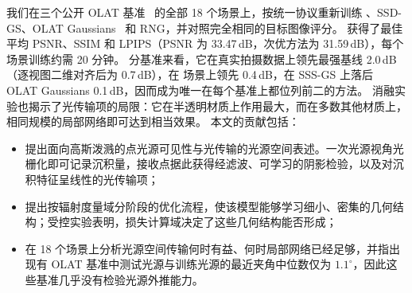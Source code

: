 我们在三个公开 OLAT 基准~\cite{zeng2023nrhints,bi2024gs3,dihlmann2024sss} 的全部 18 个场景上，按统一协议重新训练 \gsthree、SSD-GS、OLAT Gaussians~\cite{kuang2024olat} 和 RNG，并对照完全相同的目标图像评分。
\ours 获得了最佳平均 PSNR、SSIM 和 LPIPS（PSNR 为 33.47\,dB，次优方法为 31.59\,dB），每个场景训练约需 20 分钟。
分基准来看，它在真实拍摄数据上领先最强基线 2.0\,dB（逐视图二维对齐后为 0.7\,dB），在 \gsthree 场景上领先 0.4\,dB，在 SSS-GS 上落后 OLAT Gaussians 0.1\,dB，因而成为唯一在每个基准上都位列前二的方法。
消融实验也揭示了光传输项的局限：它在半透明材质上作用最大，而在多数其他材质上，相同规模的局部网络即可达到相当效果。
本文的贡献包括：
\begin{itemize}
\item 提出面向高斯泼溅的点光源可见性与光传输的光源空间表述。一次光源视角光栅化即可记录沉积量，接收点据此获得经滤波、可学习的阴影检验，以及对沉积特征呈线性的光传输项；
\item 提出按辐射度量域分阶段的优化流程，使该模型能够学习细小、密集的几何结构；受控实验表明，损失计算域决定了这些几何结构能否形成；
\item 在 18 个场景上分析光源空间传输何时有益、何时局部网络已经足够，并指出现有 OLAT 基准中测试光源与训练光源的最近夹角中位数仅为 $1.1^\circ$，因此这些基准几乎没有检验光源外推能力。
\end{itemize}
